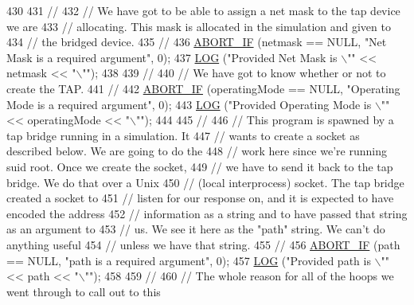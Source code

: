 \begin{DoxyCode}
430 
431   \textcolor{comment}{//}
432   \textcolor{comment}{// We have got to be able to assign a net mask to the tap device we are}
433   \textcolor{comment}{// allocating.  This mask is allocated in the simulation and given to}
434   \textcolor{comment}{// the bridged device.}
435   \textcolor{comment}{//}
436   \hyperlink{tap-creator_8cc_a91c11c90ad2f1672fbd3c031038dce16}{ABORT\_IF} (netmask == NULL, \textcolor{stringliteral}{"Net Mask is a required argument"}, 0);
437   \hyperlink{tap-creator_8cc_a158a8c64f24645c7478298399825737f}{LOG} (\textcolor{stringliteral}{"Provided Net Mask is \(\backslash\)""} << netmask << \textcolor{stringliteral}{"\(\backslash\)""});
438 
439   \textcolor{comment}{//}
440   \textcolor{comment}{// We have got to know whether or not to create the TAP.}
441   \textcolor{comment}{//}
442   \hyperlink{tap-creator_8cc_a91c11c90ad2f1672fbd3c031038dce16}{ABORT\_IF} (operatingMode == NULL, \textcolor{stringliteral}{"Operating Mode is a required argument"}, 0);
443   \hyperlink{tap-creator_8cc_a158a8c64f24645c7478298399825737f}{LOG} (\textcolor{stringliteral}{"Provided Operating Mode is \(\backslash\)""} << operatingMode << \textcolor{stringliteral}{"\(\backslash\)""});
444 
445   \textcolor{comment}{//}
446   \textcolor{comment}{// This program is spawned by a tap bridge running in a simulation.  It}
447   \textcolor{comment}{// wants to create a socket as described below.  We are going to do the}
448   \textcolor{comment}{// work here since we're running suid root.  Once we create the socket,}
449   \textcolor{comment}{// we have to send it back to the tap bridge.  We do that over a Unix}
450   \textcolor{comment}{// (local interprocess) socket.  The tap bridge created a socket to }
451   \textcolor{comment}{// listen for our response on, and it is expected to have encoded the address}
452   \textcolor{comment}{// information as a string and to have passed that string as an argument to}
453   \textcolor{comment}{// us.  We see it here as the "path" string.  We can't do anything useful }
454   \textcolor{comment}{// unless we have that string.}
455   \textcolor{comment}{//}
456   \hyperlink{tap-creator_8cc_a91c11c90ad2f1672fbd3c031038dce16}{ABORT\_IF} (path == NULL, \textcolor{stringliteral}{"path is a required argument"}, 0);
457   \hyperlink{tap-creator_8cc_a158a8c64f24645c7478298399825737f}{LOG} (\textcolor{stringliteral}{"Provided path is \(\backslash\)""} << path << \textcolor{stringliteral}{"\(\backslash\)""});
458 
459   \textcolor{comment}{//}
460   \textcolor{comment}{// The whole reason for all of the hoops we went through to call out to this}

\end{DoxyCode}
